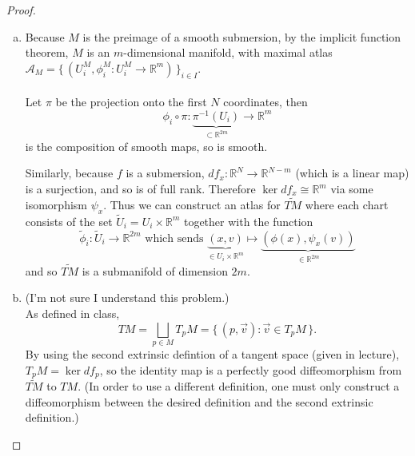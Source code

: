 \documentclass{article}
\begin{document}
\begin{proof} \text{} \\
  \begin{enumerate}[(a)]
    \item
      Because $M$ is the preimage of a smooth submersion, by the implicit
      function theorem, $M$ is an $m$-dimensional manifold, with maximal atlas $
        \mathcal{A}_M = \{\,
          (U^M_i, \phi^M_i\colon U^M_i \rightarrow \mathbb{R}^m)
        \,\}_{i \in I}
      $.\\~\\
      Let $\pi$ be the projection onto the first $N$ coordinates, then \[
        \phi_i \circ \pi\colon \underbrace{\pi^{-1}(U_i)}_{\subset \mathbb{R}^{2m}} \rightarrow \mathbb{R}^m
      \] is the composition of smooth maps, so is smooth.

      Similarly, because $f$ is a submersion,
      $df_x\colon \mathbb{R}^N \rightarrow \mathbb{R}^{N - m}$
      (which is a linear map) is a surjection, and so is of full rank. Therefore
      $\ker df_x \cong \mathbb{R}^m$ via some isomorphism $\psi_x$.
      Thus we can construct an atlas for $\widetilde{TM}$ where each chart
      consists of the set $\widetilde{U}_i = U_i \times \mathbb{R}^m$ together
      with the function \[
        \widetilde{\phi}_i\colon \widetilde{U}_i \rightarrow \mathbb{R}^{2m}
        \text{ which sends }
        \underbrace{(x, v)}_{\in U_i \times \mathbb{R}^m} \mapsto \underbrace{(\phi(x), \psi_x(v))}_{\in \mathbb{R}^{2m}}
      \] and so $\widetilde{TM}$ is a submanifold of dimension $2m$.
    \item
      (I'm not sure I understand this problem.)
      \\
      As defined in class, \[
        TM = \bigsqcup_{p \in M} T_pM = \{\, (p, \vec{v}) : \vec{v} \in T_pM \,\}.
      \]
      By using the second extrinsic defintion of a tangent space
      (given in lecture), $T_pM = \ker df_p$, so the identity map is a perfectly
      good diffeomorphism from $\widetilde{TM}$ to $TM$. (In order to use a
      different definition, one must only construct a diffeomorphism between the
      desired definition and the second extrinsic definition.)
  \end{enumerate}
\end{proof}

\pagebreak
\end{document}
